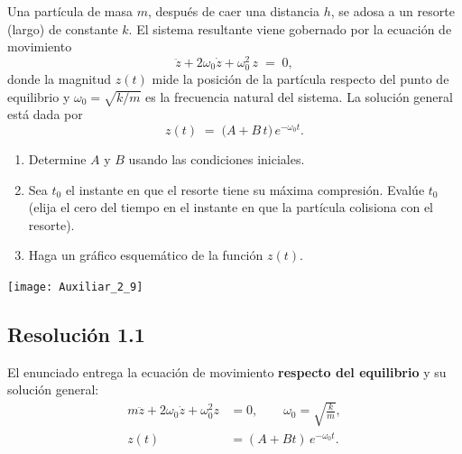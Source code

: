 \documentclass[
  11pt,
  letterpaper,
   addpoints,
  ]{exam}
\begin{document}
\begin{questions}
\noindent
\begin{minipage}[t]{0.6\textwidth}
\question Una partícula de masa $m$, después de caer una distancia $h$, se adosa a un resorte (largo) de constante $k$.
El sistema resultante viene gobernado por la ecuación de movimiento
\begin{equation}
  \ddot z + 2\omega_0 \dot z + \omega_0^{2}\, z \;=\; 0,
  \label{eq:crit}
\end{equation}
donde la magnitud $z(t)$ mide la posición de la partícula respecto del punto de equilibrio y
$\omega_0=\sqrt{k/m}$ es la frecuencia natural del sistema. La solución general está dada por
\begin{equation}
  z(t) \;=\; \big(A + B\,t\big)\,e^{-\omega_0 t}.
\end{equation}

\begin{enumerate}
  \item Determine $A$ y $B$ usando las condiciones iniciales.
  \item Sea $t_0$ el instante en que el resorte tiene su máxima compresión. Evalúe $t_0$
  (elija el cero del tiempo en el instante en que la partícula colisiona con el resorte).
  \item Haga un gráfico esquemático de la función $z(t)$.
\end{enumerate}
\end{minipage}\hfill
\begin{minipage}[t]{0.3\textwidth}
  \centering
  \vspace{-1.5\baselineskip}%
  \texttt{[image: Auxiliar\_2\_9]}
  \captionsetup{type=figure}
  \label{fig:particula-resorte}
\end{minipage}
\begin{solution}

\subsection*{Resolución 1.1}

El enunciado entrega la ecuación de movimiento \textbf{respecto del equilibrio} y su solución general:
\begin{align}
m\ddot{z}+2\omega_0\dot{z}+\omega_0^2 z&=0, \qquad \omega_0=\sqrt{\frac{k}{m}},\\
z(t)&=(A+Bt)\,e^{-\omega_0 t}.
\end{align}


\end{solution}
\end{questions}
\end{document}
